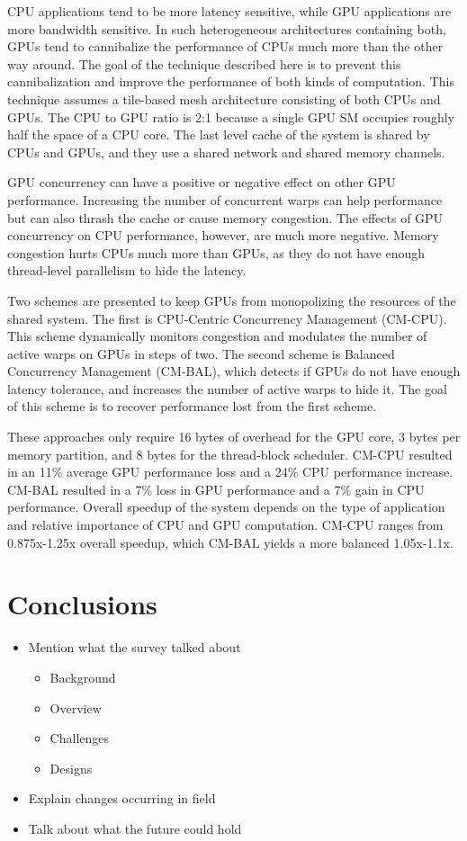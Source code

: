 \documentclass[prodmode,acmtecs]{acmsmall} %
\begin{document}
CPU applications tend to be more latency sensitive, while GPU applications are
more bandwidth sensitive. In such heterogeneous architectures containing both,
GPUs tend to cannibalize the performance of CPUs much more than the other way
around. The goal of the technique described here is to prevent this
cannibalization and improve the performance of both kinds of computation. This
technique assumes a tile-based mesh architecture consisting of both CPUs and
GPUs. The CPU to GPU ratio is 2:1 because a single GPU SM occupies roughly half
the space of a CPU core. The last level cache of the system is shared by CPUs
and GPUs, and they use a shared network and shared memory channels.

GPU concurrency can have a positive or negative effect on other GPU performance.
Increasing the number of concurrent warps can help performance but can also
thrash the cache or cause memory congestion. The effects of GPU concurrency on
CPU performance, however, are much more negative. Memory congestion hurts CPUs
much more than GPUs, as they do not have enough thread-level parallelism to hide
the latency.

Two schemes are presented to keep GPUs from monopolizing the resources of the
shared system. The first is CPU-Centric Concurrency Management (CM-CPU). This
scheme dynamically monitors congestion and modulates the number of active warps
on GPUs in steps of two. The second scheme is Balanced Concurrency Management
(CM-BAL), which detects if GPUs do not have enough latency tolerance, and
increases the number of active warps to hide it. The goal of this scheme is to
recover performance lost from the first scheme.

These approaches only require 16 bytes of overhead for the GPU core, 3 bytes per
memory partition, and 8 bytes for the thread-block scheduler. CM-CPU resulted in
an 11\% average GPU performance loss and a 24\% CPU performance increase. CM-BAL
resulted in a 7\% loss in GPU performance and a 7\% gain in CPU performance.
Overall speedup of the system depends on the type of application and relative
importance of CPU and GPU computation. CM-CPU ranges from 0.875x-1.25x overall
speedup, which CM-BAL yields a more balanced 1.05x-1.1x.

\section{Conclusions} \label{sec:conclusions}
\begin{itemize}
\item Mention what the survey talked about
  \begin{itemize}
  \item Background
  \item Overview
  \item Challenges
  \item Designs
  \end{itemize}
\item Explain changes occurring in field
\item Talk about what the future could hold
\end{itemize}
\end{document}
